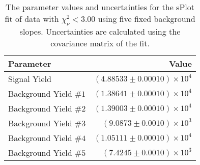 
\begin{table}[h]
    \begin{center}
        \begin{tabular}{lr}\toprule
            Parameter & Value \\\midrule
            Signal Yield & $(4.88533 \pm 0.00010) \times 10^{4}$ \\
            Background Yield $\#1$ & $(1.38641 \pm 0.00010) \times 10^{4}$ \\
            Background Yield $\#2$ & $(1.39003 \pm 0.00010) \times 10^{4}$ \\
            Background Yield $\#3$ & $(9.0873 \pm 0.0010) \times 10^{3}$ \\
            Background Yield $\#4$ & $(1.05111 \pm 0.00010) \times 10^{4}$ \\
            Background Yield $\#5$ & $(7.4245 \pm 0.0010) \times 10^{3}$ \\\bottomrule
        \end{tabular}
        \caption{The parameter values and uncertainties for the sPlot fit of data with $\chi^2_\nu < 3.00$ using five fixed background slopes. Uncertainties are calculated using the covariance matrix of the fit.}
    \end{center}
\end{table}
